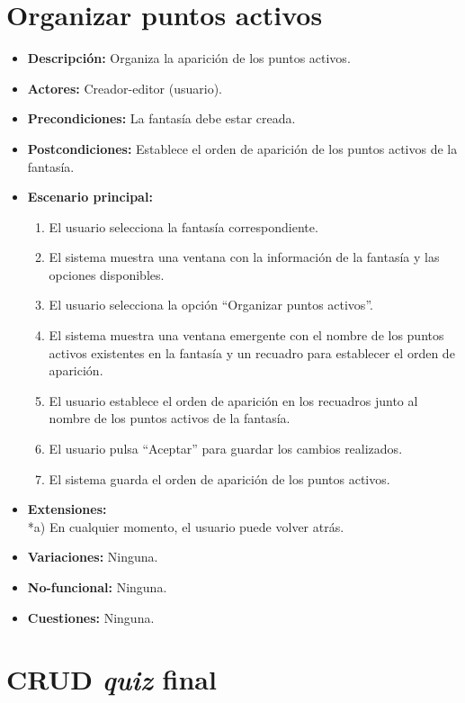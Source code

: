 \section{Organizar puntos activos}
\begin{itemize}
	\item \textbf{Descripción:} Organiza la aparición de los puntos activos.
	\item \textbf{Actores:} Creador-editor (usuario).
	\item \textbf{Precondiciones:} La fantasía debe estar creada.
	\item \textbf{Postcondiciones:} Establece el orden de aparición de los puntos activos de la fantasía.
	\item \textbf{Escenario principal:}
	\begin{enumerate}
		\item El usuario selecciona la fantasía correspondiente.
		\item El sistema muestra una ventana con la información de la fantasía y las opciones disponibles.
		\item El usuario selecciona la opción ``Organizar puntos activos''.
		\item El sistema muestra una ventana emergente con el nombre de los puntos activos existentes en la fantasía y un recuadro para establecer el orden de aparición.
		\item El usuario establece el orden de aparición en los recuadros junto al nombre de los puntos activos de la fantasía.
		\item El usuario pulsa ``Aceptar'' para guardar los cambios realizados.
		\item El sistema guarda el orden de aparición de los puntos activos.
	\end{enumerate}
	\item \textbf{Extensiones:} \\ *a) En cualquier momento, el usuario puede volver atrás.
	\item \textbf{Variaciones:} Ninguna.
	\item \textbf{No-funcional:} Ninguna.
	\item \textbf{Cuestiones:} Ninguna.
\end{itemize}

\section{CRUD \textit{quiz} final}
\hypertarget{crearquizfinal}{}

